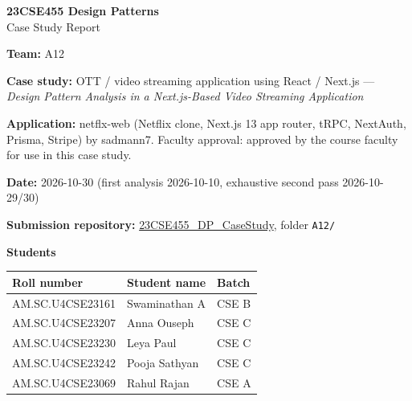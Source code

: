 \documentclass[11pt,a4paper]{article}
\newcommand{\entry}[2]{\textbf{#1:} #2\par}
\begin{document}
\begin{center}\Large\textbf{23CSE455 Design Patterns}\\[4pt]\LARGE Case Study Report\end{center}

\entry{Team}{A12}
\entry{Case study}{OTT / video streaming application using React / Next.js --- \emph{Design Pattern Analysis in a Next.js-Based Video Streaming Application}}
\entry{Application}{netflx-web (Netflix clone, Next.js 13 app router, tRPC, NextAuth, Prisma, Stripe) by sadmann7. Faculty approval: approved by the course faculty for use in this case study.}
\entry{Date}{2026-10-30 (first analysis 2026-10-10, exhaustive second pass 2026-10-29/30)}
\textbf{Submission repository:} \href{https://github.com/aswathymohan-amrita/23CSE455_DP_CaseStudy}{23CSE455\_DP\_CaseStudy}, folder \texttt{A12/}\par
\textbf{Students}\par
\begin{tabularx}{\linewidth}{@{}llX@{}}\toprule
Roll number & Student name & Batch\\\midrule
AM.SC.U4CSE23161 & Swaminathan A & CSE B\\
AM.SC.U4CSE23207 & Anna Ouseph & CSE C\\
AM.SC.U4CSE23230 & Leya Paul & CSE C\\
AM.SC.U4CSE23242 & Pooja Sathyan & CSE C\\
AM.SC.U4CSE23069 & Rahul Rajan & CSE A\\\bottomrule
\end{tabularx}
\end{document}
